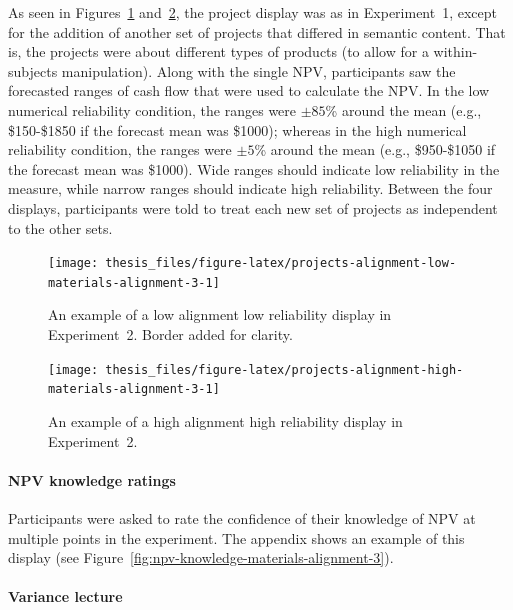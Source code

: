 \documentclass[a4paper, nobind, dvipsnames]{templates/ociamthesis}
\theoremstyle{definition}
\theoremstyle{definition}
\theoremstyle{definition}
\theoremstyle{definition}
\theoremstyle{remark}
\begin{document}
As seen in Figures~\ref{fig:projects-alignment-low-materials-alignment-3}
and~\ref{fig:projects-alignment-high-materials-alignment-3}, the project
display was as in Experiment~1, except for the addition of another set of
projects that differed in semantic content. That is, the projects were about
different types of products (to allow for a within-subjects manipulation). Along
with the single NPV, participants saw the forecasted ranges of cash flow that
were used to calculate the NPV. In the low numerical reliability condition, the
ranges were \(\pm85\)\% around the mean (e.g., \$150-\$1850 if the forecast mean was
\$1000); whereas in the high numerical reliability condition, the ranges were
\(\pm5\)\% around the mean (e.g., \$950-\$1050 if the forecast mean was \$1000). Wide
ranges should indicate low reliability in the measure, while narrow ranges
should indicate high reliability. Between the four displays, participants were
told to treat each new set of projects as independent to the other sets.



\begin{figure}
\texttt{[image: thesis\_files/figure-latex/projects-alignment-low-materials-alignment-3-1]} \caption{An example of a low alignment low reliability display in Experiment~2. Border added for clarity.}\label{fig:projects-alignment-low-materials-alignment-3}
\end{figure}



\begin{figure}
\texttt{[image: thesis\_files/figure-latex/projects-alignment-high-materials-alignment-3-1]} \caption{An example of a high alignment high reliability display in Experiment~2.}\label{fig:projects-alignment-high-materials-alignment-3}
\end{figure}

\paragraph{NPV knowledge ratings}

Participants were asked to rate the confidence of their knowledge of NPV at
multiple points in the experiment. The appendix shows an example of this display
(see Figure~\ref{fig:npv-knowledge-materials-alignment-3}).

\paragraph{Variance lecture}
\end{document}
